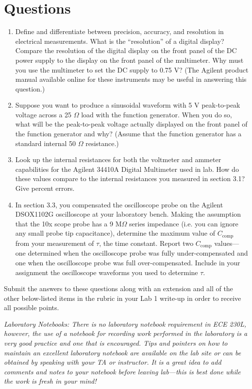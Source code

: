 \documentclass[12pt]{../manual}
\begin{document}
\newpage
\section{Questions}
\begin{enumerate}
\item Define and differentiate between precision, accuracy, and resolution in electrical measurements. What is the ``resolution'' of a digital display? Compare the resolution of the digital display on the front panel of the DC power supply to the display on the front panel of the multimeter. Why must you use the multimeter to set the DC supply to 0.75 V? (The Agilent product manual available online for these instruments may be useful in answering this question.)
\item Suppose you want to produce a sinusoidal waveform with 5 V peak-to-peak voltage across a 25 $\Omega$ load with the function generator. When you do so, what will be the peak-to-peak voltage actually displayed on the front panel of the function generator and why? (Assume that the function generator has a standard internal 50 $\Omega$ resistance.)
\item Look up the internal resistances for both the voltmeter and ammeter capabilities for the Agilent 34410A Digital Multimeter used in lab. How do these values compare to the internal resistances you measured in section 3.1? Give percent errors.
\item In section 3.3, you compensated the oscilloscope probe on the Agilent DSOX1102G oscilloscope at your laboratory bench.  Making the assumption that the 10x scope probe has a 9 M$\Omega$ series impedance (i.e. you can ignore any small probe tip capacitance), determine the maximum value of $C_{\mathrm{comp}}$ from your measurement of $\tau$, the time constant.  Report two $C_{\mathrm{comp}}$ values---one determined when the oscilloscope probe was fully under-compensated and one when the oscilloscope probe was full over-compensated.  Include in your assignment the oscilloscope waveforms you used to determine $\tau$. 
\end{enumerate}
Submit the answers to these questions along with an extension and all of the other below-listed items in the rubric in your Lab 1 write-up in order to receive all possible points. 

\textit{Laboratory Notebooks:  There is no laboratory notebook requirement in ECE 230L, however, the use of a notebook for recording work performed in the laboratory is a very good practice and one that is encouraged.  Tips and pointers on how to maintain an excellent laboratory notebook are available on the lab site or can be obtained by speaking with your TA or instructor. It is a great idea to add comments and notes to your notebook before leaving lab---this is best done while the work is fresh in your mind!}
\newpage
\end{document}
